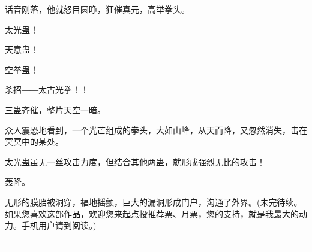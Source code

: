 \begin{this_body}
话音刚落，他就怒目圆睁，狂催真元，高举拳头。

太光蛊！

天意蛊！

空拳蛊！

杀招――太古光拳！！

三蛊齐催，整片天空一暗。

众人震恐地看到，一个光芒组成的拳头，大如山峰，从天而降，又忽然消失，击在冥冥中的某处。

太光蛊虽无一丝攻击力度，但结合其他两蛊，就形成强烈无比的攻击！

轰隆。

无形的膜胎被洞穿，福地摇颤，巨大的漏洞形成门户，沟通了外界。(未完待续。如果您喜欢这部作品，欢迎您来起点投推荐票、月票，您的支持，就是我最大的动力。手机用户请到阅读。)

------------

\end{this_body}

